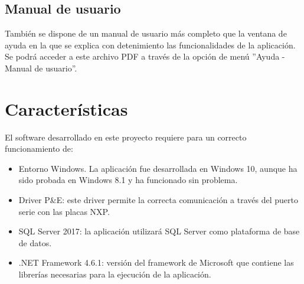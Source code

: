 
\subsection{Manual de usuario}

También se dispone de un manual de usuario más completo que la ventana de ayuda en la que se explica con detenimiento las funcionalidades de la aplicación. Se podrá acceder a este archivo PDF a través de la opción de menú ''Ayuda - Manual de usuario''.


\section{Características}

El software desarrollado en este proyecto requiere para un correcto funcionamiento de:
\begin{itemize}
	\item Entorno Windows. La aplicación fue desarrollada en Windows 10, aunque ha sido probada en Windows 8.1 y ha funcionado sin problema.
	\item Driver P\&E: este driver permite la correcta comunicación a través del puerto serie con las placas NXP.
	\item SQL Server 2017: la aplicación utilizará SQL Server como plataforma de base de datos.
	\item .NET Framework 4.6.1: versión del framework de Microsoft que contiene las librerías necesarias para la ejecución de la aplicación.
\end{itemize}